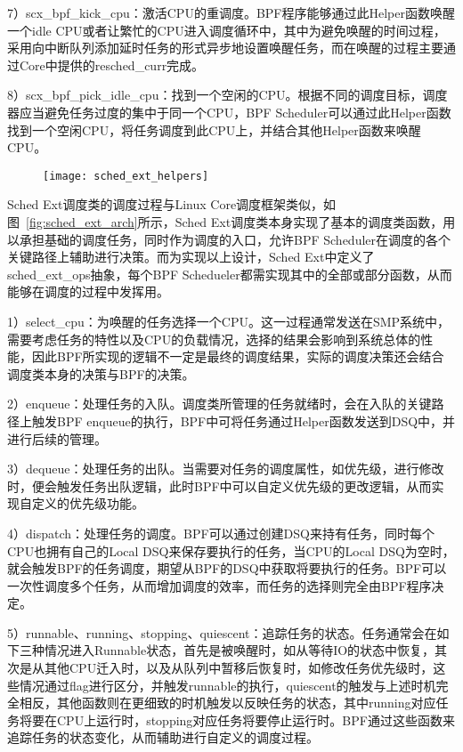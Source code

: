 7）scx\_bpf\_kick\_cpu：激活CPU的重调度。BPF程序能够通过此Helper函数唤醒一个idle CPU或者让繁忙的CPU进入调度循环中，其中为避免唤醒的时间过程，采用向中断队列添加延时任务的形式异步地设置唤醒任务，而在唤醒的过程主要通过Core中提供的resched\_curr完成。

8）scx\_bpf\_pick\_idle\_cpu：找到一个空闲的CPU。根据不同的调度目标，调度器应当避免任务过度的集中于同一个CPU，BPF Scheduler可以通过此Helper函数找到一个空闲CPU，将任务调度到此CPU上，并结合其他Helper函数来唤醒CPU。

\begin{figure}[!htbp]
    \centering
    \texttt{[image: sched\_ext\_helpers]}
    \label{fig:sched_ext_helpers}
\end{figure}

Sched Ext调度类的调度过程与Linux Core调度框架类似，如图~\ref{fig:sched_ext_arch}所示，Sched Ext调度类本身实现了基本的调度类函数，用以承担基础的调度任务，同时作为调度的入口，允许BPF Scheduler在调度的各个关键路径上辅助进行决策。而为实现以上设计，Sched Ext中定义了sched\_ext\_ops抽象，每个BPF Schedueler都需实现其中的全部或部分函数，从而能够在调度的过程中发挥用。

1）select\_cpu：为唤醒的任务选择一个CPU。这一过程通常发送在SMP系统中，需要考虑任务的特性以及CPU的负载情况，选择的结果会影响到系统总体的性能，因此BPF所实现的逻辑不一定是最终的调度结果，实际的调度决策还会结合调度类本身的决策与BPF的决策。

2）enqueue：处理任务的入队。调度类所管理的任务就绪时，会在入队的关键路径上触发BPF enqueue的执行，BPF中可将任务通过Helper函数发送到DSQ中，并进行后续的管理。

3）dequeue：处理任务的出队。当需要对任务的调度属性，如优先级，进行修改时，便会触发任务出队逻辑，此时BPF中可以自定义优先级的更改逻辑，从而实现自定义的优先级功能。

4）dispatch：处理任务的调度。BPF可以通过创建DSQ来持有任务，同时每个CPU也拥有自己的Local DSQ来保存要执行的任务，当CPU的Local DSQ为空时，就会触发BPF的任务调度，期望从BPF的DSQ中获取将要执行的任务。BPF可以一次性调度多个任务，从而增加调度的效率，而任务的选择则完全由BPF程序决定。

5）runnable、running、stopping、quiescent：追踪任务的状态。任务通常会在如下三种情况进入Runnable状态，首先是被唤醒时，如从等待IO的状态中恢复，其次是从其他CPU迁入时，以及从队列中暂移后恢复时，如修改任务优先级时，这些情况通过flag进行区分，并触发runnable的执行，quiescent的触发与上述时机完全相反，其他函数则在更细致的时机触发以反映任务的状态，其中running对应任务将要在CPU上运行时，stopping对应任务将要停止运行时。BPF通过这些函数来追踪任务的状态变化，从而辅助进行自定义的调度过程。

